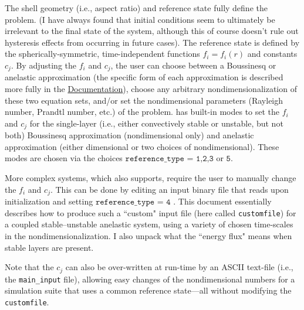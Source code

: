 \documentclass[12pt]{article}
\numberwithin{equation}{section}
\begin{document}
The shell geometry (i.e., aspect ratio) and reference state fully define the problem. (I have always found that initial conditions seem to ultimately be irrelevant to the final state of the system, although this of course doesn't rule out hysteresis effects from occurring in future cases). The reference state is defined by the spherically-symmetric, time-independent functions $f_i=f_i(r)$ and constants $c_j$. By adjusting the $f_i$ and $c_j$, the user can choose between a Boussinesq or anelastic approximation (the specific form of each approximation is described more fully in the  \href{https://rayleigh-documentation.readthedocs.io/en/latest/doc/source/User_Guide/physics_math_overview.html#the-system-of-equations-solved-in-rayleigh}{Documentation}), choose any arbitrary nondimensionalization of these two equation sets, and/or set the nondimensional parameters (Rayleigh number, Prandtl number, etc.) of the problem.  {\rayleigh} has built-in modes to set the $f_i$ and $c_j$ for the single-layer (i.e., either convectively stable or unstable, but not both) Boussinesq approximation (nondimensional only) and anelastic approximation (either dimensional or two choices of nondimensional). These modes are chosen via the choices $\texttt{reference\_type = 1,2,3}$ or $\texttt{5}$. 

More complex systems, which {\rayleigh} also supports, require the user to manually change the $f_i$ and $c_j$. This can be done by editing an input binary file that {\rayleigh} reads upon initialization and setting $\texttt{reference\_type = 4}$ . This document essentially describes how to produce such a ``custom" input file (here called {\texttt{customfile}}) for a coupled stable--unstable anelastic system, using a variety of chosen time-scales in the nondimensionalization. I also unpack what the ``energy flux" means when stable layers are present. 

Note that the $c_j$ can also be over-written at run-time by an ASCII text-file (i.e., the \texttt{main\_input} file), allowing easy changes of the nondimensional numbers for a simulation suite that uses a common reference state---all without modifying the  {\texttt{customfile}}.
	
\end{document}
